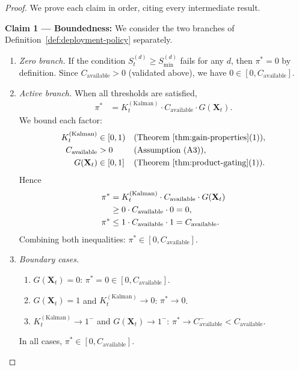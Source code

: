 \documentclass[12pt,openany]{book}
\numberwithin{equation}{chapter}
\theoremstyle{plain}
\theoremstyle{definition}
\theoremstyle{remark}
\def\mathcal#1{#1}%
\begin{document}
\begin{proof}
We prove each claim in order, citing every intermediate result.

\medskip
\noindent\textbf{Claim 1 --- Boundedness:}
We consider the two branches of
Definition~\ref{def:deployment-policy} separately.

\begin{enumerate}
  \item[(1a)] \emph{Zero branch.}
        If the condition
        $\mathcal{S}_t^{(d)} \geq \mathcal{S}_{\min}^{(d)}$
        fails for any $d$, then $\pi^* = 0$
        by definition.  Since $C_{\mathrm{available}} > 0$
        (validated above), we have
        $0 \in [0, C_{\mathrm{available}}]$.

  \item[(1b)] \emph{Active branch.}
        When all thresholds are satisfied,
        \begin{align}
          \pi^*
          &= K_t^{(\mathrm{Kalman})}
             \cdot C_{\mathrm{available}}
             \cdot G(\mathbf{X}_t).
        \end{align}
        We bound each factor:
        \begin{align}
          K_t^{(\mathrm{Kalman})} &\in [0,1)
          &&\text{(Theorem~\ref{thm:gain-properties}(1))},\\
          C_{\mathrm{available}} &> 0
          &&\text{(Assumption (A3))},\\
          G(\mathbf{X}_t) &\in [0,1]
          &&\text{(Theorem~\ref{thm:product-gating}(1))}.
        \end{align}
        Hence
        \begin{align}
          \pi^*
          &= K_t^{(\mathrm{Kalman})}
             \cdot C_{\mathrm{available}}
             \cdot G(\mathbf{X}_t) \notag\\
          &\geq 0 \cdot C_{\mathrm{available}} \cdot 0
           = 0,\\
          \pi^*
          &\leq 1 \cdot C_{\mathrm{available}} \cdot 1
           = C_{\mathrm{available}}.
        \end{align}
        Combining both inequalities:
        $\pi^* \in [0, C_{\mathrm{available}}]$.

  \item[(1c)] \emph{Boundary cases.}
        \begin{enumerate}
          \item $G(\mathbf{X}_t) = 0$:
                $\pi^* = 0 \in [0, C_{\mathrm{available}}]$.
          \item $G(\mathbf{X}_t) = 1$ and
                $K_t^{(\mathrm{Kalman})} \to 0$:
                $\pi^* \to 0$.
          \item $K_t^{(\mathrm{Kalman})} \to 1^-$ and
                $G(\mathbf{X}_t) \to 1^-$:
                $\pi^* \to C_{\mathrm{available}}^-
                < C_{\mathrm{available}}$.
        \end{enumerate}
        In all cases, $\pi^* \in [0, C_{\mathrm{available}}]$.
\end{enumerate}


\end{proof}
\end{document}
